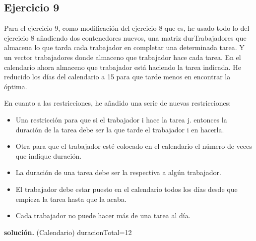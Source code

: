 \documentclass[a4paper,11pt]{article}
\begin{document}
\subsection{Ejercicio 9}
Para el ejercicio 9, como modificación del ejercicio 8 que es, he usado todo lo del ejercicio 8 añadiendo dos contenedores nuevos, una matriz durTrabajadores que almacena lo que tarda cada trabajador en completar una determinada tarea. Y un vector trabajadores donde almaceno que trabajador hace cada tarea. En el calendario ahora almaceno que trabajador está haciendo la tarea indicada. He reducido los días del calendario a 15 para que tarde menos en encontrar la óptima.

En cuanto a las restricciones, he añadido una serie de nuevas restricciones:

\begin{itemize}
\item Una restricción para que si el trabajador i hace la tarea j. entonces la duración de la tarea debe ser la que tarde el trabajador i en hacerla.
\item Otra para que el trabajador esté colocado en el calendario el número de veces que indique duración.
\item La duración de una tarea debe ser la respectiva a algún trabajador.
\item El trabajador debe estar puesto en el calendario todos los días desde que empieza la tarea hasta que la acaba.
\item Cada trabajador no puede hacer más de una tarea al día.
\end{itemize}

\textbf{solución.} (Calendario) duracionTotal=12
\end{document}
